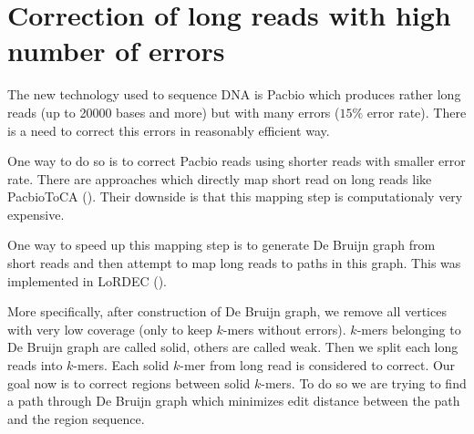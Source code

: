 \section{Correction of long reads with high number of errors}

The new technology used to sequence DNA is Pacbio which produces
rather long reads (up to 20000 bases and more) but with many errors
($15\%$ error rate). There is a need to correct this errors in reasonably
efficient way.

One way to do so is to correct Pacbio reads using shorter reads with smaller
error rate. There are approaches which directly map short read on long reads like
PacbioToCA (\cite{PacbioToCA}). Their downside is that this mapping step
is computationaly very expensive.

One way to speed up this mapping step is to generate De Bruijn graph from short reads
and then attempt to map long reads to paths in this graph. This was implemented
in LoRDEC (\cite{Lordec}).

More specifically, after construction of De Bruijn graph, we remove all vertices
with very low coverage (only to keep $k$-mers without errors). $k$-mers belonging
to De Bruijn graph are called solid, others are called weak.
Then we split each long reads into $k$-mers. Each solid $k$-mer from long read is considered to correct. 
Our goal now is to correct regions between solid $k$-mers. To do so we are trying
to find a path through De Bruijn graph which minimizes edit distance between the path
and the region sequence. 
